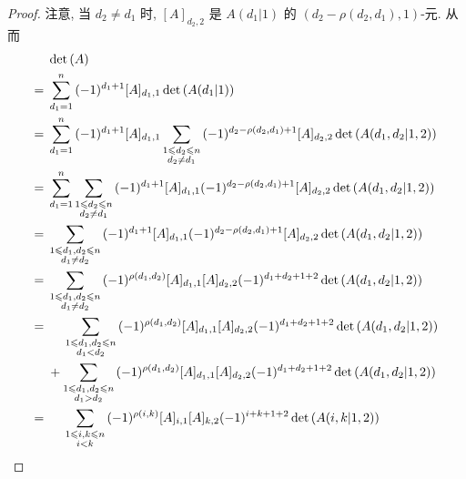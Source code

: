 \documentclass[../libro.tex]{subfiles}
\begin{document}
\begin{proof}
    注意, 当 \(d_2 \neq d_1\) 时,
    \([A]_{d_2,2}\) 是
    \(A(d_1|1)\) 的
    \((d_2 - \rho(d_2, d_1), 1)\)-元.
    从而
    \begin{align*}
        & \det {(A)}
        \\
        = {} &
        \sum_{d_1 = 1}^{n} {(-1)^{d_1+1} [A]_{d_1,1}
        \det {(A(d_1|1))}}
        \\
        = {} &
        \sum_{d_1 = 1}^{n} {(-1)^{d_1+1} [A]_{d_1,1}
            \sum_{\substack{1 \leq d_2 \leq n \\ d_2 \neq d_1}}
            {(-1)^{d_2 - \rho(d_2,d_1) + 1} [A]_{d_2,2}
        \det {(A(d_1,d_2|1,2))}}}
        \\
        = {} &
        \sum_{d_1 = 1}^{n}
        {\sum_{\substack{1 \leq d_2 \leq n \\ d_2 \neq d_1}}
            {(-1)^{d_1+1} [A]_{d_1,1}
                (-1)^{d_2 - \rho(d_2,d_1) + 1} [A]_{d_2,2}
        \det {(A(d_1,d_2|1,2))}}}
        \\
        = {} &
        \sum_{\substack{1 \leq d_1,d_2 \leq n \\ d_1 \neq d_2}}
        {(-1)^{d_1+1} [A]_{d_1,1}
            (-1)^{d_2 - \rho(d_2,d_1) + 1} [A]_{d_2,2}
        \det {(A(d_1,d_2|1,2))}}
        \\
        = {} &
        \sum_{\substack{1 \leq d_1,d_2 \leq n \\ d_1 \neq d_2}}
        {(-1)^{\rho(d_1,d_2)}
            [A]_{d_1,1} [A]_{d_2,2}
            (-1)^{d_1+d_2+1+2}
        \det {(A(d_1,d_2|1,2))}}
        \\
        = {} &
        \hphantom{{} + {}}
        \sum_{\substack{1 \leq d_1,d_2 \leq n \\ d_1 < d_2}}
        {(-1)^{\rho(d_1,d_2)}
            [A]_{d_1,1} [A]_{d_2,2}
            (-1)^{d_1+d_2+1+2}
        \det {(A(d_1,d_2|1,2))}}
        \\
        &
        +
        \sum_{\substack{1 \leq d_1,d_2 \leq n \\ d_1 > d_2}}
        {(-1)^{\rho(d_1,d_2)}
            [A]_{d_1,1} [A]_{d_2,2}
            (-1)^{d_1+d_2+1+2}
        \det {(A(d_1,d_2|1,2))}}
        \\
        = {} &
        \hphantom{{} + {}}
        \sum_{\substack{1 \leq i,k \leq n \\ i < k}}
        {(-1)^{\rho(i,k)}
            [A]_{i,1} [A]_{k,2}
            (-1)^{i+k+1+2}
        \det {(A(i,k|1,2))}}
        \\

\end{align*}
\end{proof}
\end{document}
